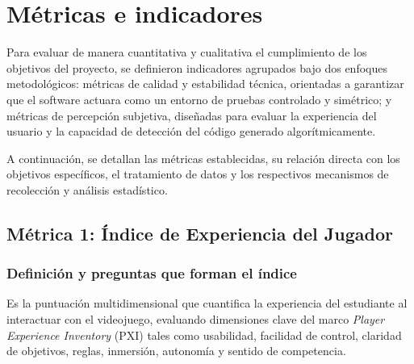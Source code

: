 \section{Métricas e indicadores}

Para evaluar de manera cuantitativa y cualitativa el cumplimiento de los objetivos del proyecto, se definieron indicadores agrupados bajo dos enfoques metodológicos: métricas de calidad y estabilidad técnica, orientadas a garantizar que el software actuara como un entorno de pruebas controlado y simétrico; y métricas de percepción subjetiva, diseñadas para evaluar la experiencia del usuario y la capacidad de detección del código generado algorítmicamente. 

A continuación, se detallan las métricas establecidas, su relación directa con los objetivos específicos, el tratamiento de datos y los respectivos mecanismos de recolección y análisis estadístico. 

\subsection{Métrica 1: Índice de Experiencia del Jugador} 

\subsubsection{Definición y preguntas que forman el índice} 
Es la puntuación multidimensional que cuantifica la experiencia del estudiante al interactuar con el videojuego, evaluando dimensiones clave del marco \textit{Player Experience Inventory} (PXI) tales como usabilidad, facilidad de control, claridad de objetivos, reglas, inmersión, autonomía y sentido de competencia. 

